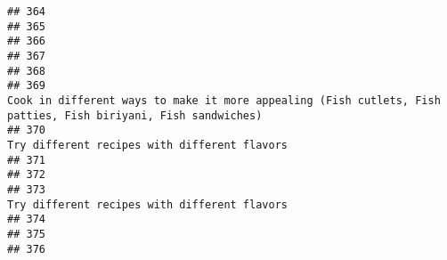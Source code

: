 \documentclass[
]{article}
\begin{document}
\begin{verbatim}
## 364                                                                                                                                                                                                             
## 365                                                                                                                                                                                                             
## 366                                                                                                                                                                                                             
## 367                                                                                                                                                                                                             
## 368                                                                                                                                                                                                             
## 369                                                                                                Cook in different ways to make it more appealing (Fish cutlets, Fish patties, Fish biriyani, Fish sandwiches)
## 370                                                                                                                                                                 Try different recipes with different flavors
## 371                                                                                                                                                                                                             
## 372                                                                                                                                                                                                             
## 373                                                                                                                                                                 Try different recipes with different flavors
## 374                                                                                                                                                                                                             
## 375                                                                                                                                                                                                             
## 376                                                                                                                                                                                                             

\end{verbatim}
\end{document}
